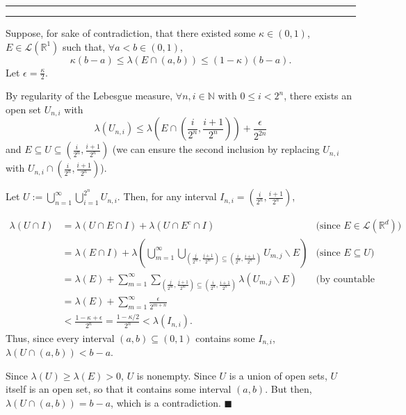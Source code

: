 \documentclass[11pt]{article}
\newcounter{questionCounter}
\newcounter{partCounter}[questionCounter]
\newenvironment{question}[2][\arabic{questionCounter}]{%
    \setcounter{partCounter}{0}%
    \vspace{.25in} \hrule \vspace{0.5em}%
        \noindent{\bf #2}%
    \vspace{0.8em} \hrule \vspace{.10in}%
    \addtocounter{questionCounter}{1}%
}{}
\renewcommand{\qed}{\quad $\blacksquare$}
\newcommand{\sminus}{\backslash}
\newcommand{\N}{\mathbb{N}} %
\newcommand{\R}{\mathbb{R}} %
\newcommand{\LR}[1]{\mathcal{L}\left(\R^{#1}\right)} %
\begin{document}
\begin{question}{Problem 4}
Suppose, for sake of contradiction, that there existed some
$\kappa \in (0,1)$, $E \in \LR{1}$ such that, $\forall a < b \in (0,1)$,
\[\kappa (b - a) \leq \lambda(E \cap (a,b)) \leq (1 - \kappa)(b - a).\]
Let $\epsilon = \frac{\kappa}{2}$.

By regularity of the Lebesgue measure, $\forall n,i \in \N$ with
$0 \leq i < 2^n$, there exists an open set $U_{n,i}$ with
\[\lambda(U_{n,i})
 \leq \lambda\left(
        E \cap
          \left( \frac{i}{2^n}, \frac{i + 1}{2^n} \right)
      \right)
    + \frac{\epsilon}{2^{2n}}\]
and $E \subseteq U \subseteq \left( \frac{i}{2^n}, \frac{i + 1}{2^n} \right)$ (we
can ensure the second inclusion by replacing $U_{n,i}$ with
$U_{n,i} \cap \left( \frac{i}{2^n}, \frac{i + 1}{2^n} \right)$).

Let $U := \bigcup_{n = 1}^{\infty} \bigcup_{i = 1}^{2^n} U_{n,i}$. Then, for
any interval $I_{n,i} = \left( \frac{i}{2^n}, \frac{i + 1}{2^n} \right)$, 

\begin{align*}
\lambda(U \cap I)
 & = \lambda(U \cap E \cap I) + \lambda(U \cap E^c \cap I)
                                     & \mbox{(since $E \in \LR{d}$)}        \\
 & = \lambda(E \cap I)
   + \lambda\left(
       \bigcup_{m = 1}^{\infty}
         \bigcup_{
           \left( \frac{j}{2^m}, \frac{j + 1}{2^m} \right)
             \subseteq
           \left( \frac{i}{2^n}, \frac{i + 1}{2^n} \right)}
       U_{m,j} \sminus E
     \right)
                                     & \mbox{(since $E \subseteq U$)}       \\
 & = \lambda(E) + \sum_{m = 1}^{\infty}
         \sum_{
           \left( \frac{j}{2^m}, \frac{j + 1}{2^m} \right)
             \subseteq
           \left( \frac{i}{2^n}, \frac{i + 1}{2^n} \right)}
        \lambda(U_{m,j} \sminus E)
                                     & \mbox{(by countable subadditivity)}  \\
 & = \lambda(E) + \sum_{m = 1}^{\infty} \frac{\epsilon}{2^{m + n}} \\
 & < \frac{1 - \kappa + \epsilon}{2^n}
   = \frac{1 - \kappa/2}{2^n}
   < \lambda(I_{n,i}).
\end{align*}
Thus, since every interval $(a,b) \subseteq (0,1)$ contains some $I_{n,i}$,
$\lambda(U \cap (a,b)) < b - a$.

Since $\lambda(U) \geq \lambda(E) > 0$, $U$ is nonempty. Since $U$ is a union
of open sets, $U$ itself is an open set, so that it contains some interval
$(a,b)$. But then, $\lambda(U \cap (a,b)) = b - a$, which is a contradiction.
\qed
\end{question}
\end{document}
